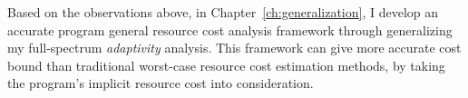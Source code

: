  Based on the observations above, in Chapter~\ref{ch:generalization},
 I develop
 an accurate program general resource cost analysis framework through generalizing my full-spectrum \emph{adaptivity} analysis.
 This framework can give more accurate cost bound than traditional worst-case resource cost estimation methods,
 by taking the program's implicit resource cost into consideration.


